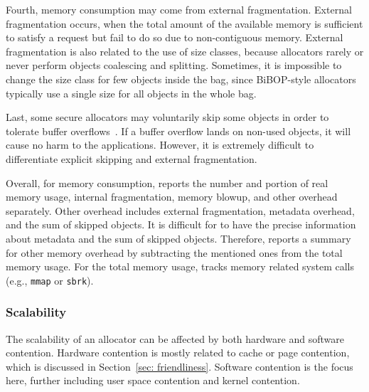 Fourth, memory consumption may come from external fragmentation. External fragmentation occurs, when the total amount of the available memory is sufficient to satisfy a request but fail to do so due to non-contiguous memory. External fragmentation is also related to the use of size classes, because allocators rarely or never perform objects coalescing and splitting.
Sometimes, it is impossible to change the size class for few objects inside the bag, since BiBOP-style allocators typically use a single size for all objects in the whole bag. 

 Last, some secure allocators may voluntarily skip some objects in order to tolerate buffer overflows~\citep{DieHard, DieHarder, Guarder}. If a buffer overflow lands on non-used objects, it will cause no harm to the applications. However, it is extremely difficult to differentiate explicit skipping and external fragmentation. 


Overall, for memory consumption, \MP{} reports the number and portion of real memory usage, internal fragmentation, memory blowup, and other overhead separately. Other overhead includes external fragmentation, metadata overhead, and the sum of skipped objects. It is difficult for \MP{} to have the precise information about metadata and the sum of skipped objects. Therefore, \MP{} reports a summary for other memory overhead by subtracting the mentioned ones from the total memory usage. For the total memory usage, \MP{} tracks memory related system calls (e.g., \texttt{mmap} or \texttt{sbrk}). 


\subsubsection{Scalability} 
\label{sec:scalability}

The scalability of an allocator can be affected by both hardware and software contention. Hardware contention is mostly related to cache or page contention, which is discussed in Section~\ref{sec: friendliness}. Software contention is the focus here, further including user space contention and kernel contention. 

